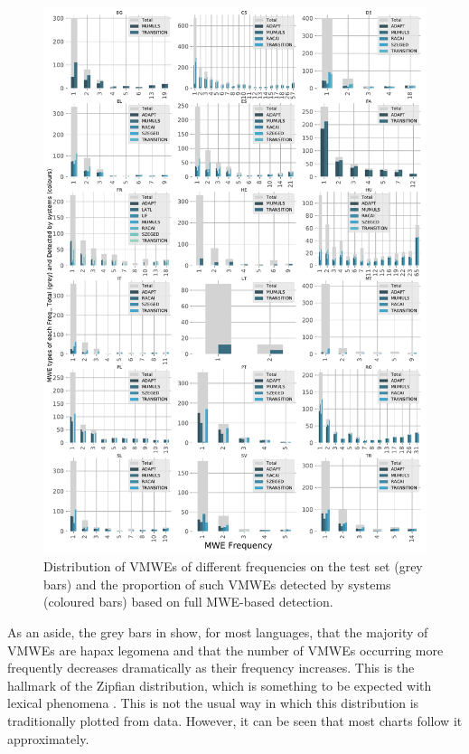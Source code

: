 \documentclass[output=paper
,modfonts
,nonflat,draftmode]{langsci/langscibook}
\begin{document}
\begin{figure}
\includegraphics[scale=0.48]{figures/matched-mwes.pdf}
\caption{\label{fig:matched-mwes}Distribution of VMWEs of different frequencies on the test set (grey bars) and the proportion of such VMWEs detected by systems (coloured bars) based on full MWE-based detection.}
\end{figure}

As an aside, the grey bars in  show, for most languages, that the majority of VMWEs are hapax legomena and that the number of VMWEs occurring more frequently decreases dramatically as their frequency increases. This is the hallmark of the Zipfian distribution, which is something to be expected with lexical phenomena \citep[pp.~22--6]{Manning}. This is not the usual way in which this distribution is traditionally plotted from data. However, it can be seen that most charts follow it approximately.
\end{document}
